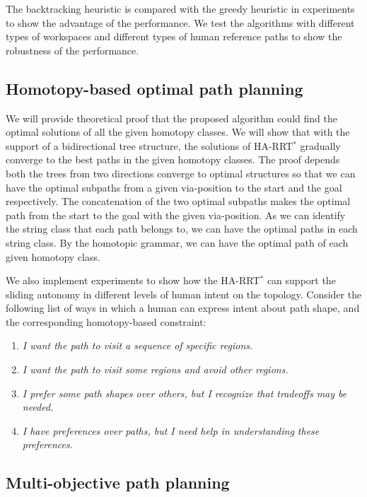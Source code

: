 \documentclass[phd]{byuprop}
\begin{document}
The backtracking heuristic is compared with the greedy heuristic in experiments to show the advantage of the performance.
We test the algorithms with different types of workspaces and different types of human reference paths to show the robustness of the performance.


\subsection{Homotopy-based optimal path planning}

We will provide theoretical proof that the proposed algorithm could find the optimal solutions of all the given homotopy classes.
We will show that with the support of a bidirectional tree structure, the solutions of HA-RRT$^{*}$ gradually converge to the best paths in the given homotopy classes.
The proof depends both the trees from two directions converge to optimal structures so that we can have the optimal subpaths from a given via-position to the start and the goal respectively.
The concatenation of the two optimal subpaths makes the optimal path from the start to the goal with the given via-position.
As we can identify the string class that each path belongs to, we can have the optimal paths in each string class.
By the homotopic grammar, we can have the optimal path of each given homotopy class.

We also implement experiments to show how the HA-RRT$^{*}$ can support the sliding autonomy in different levels of human intent on the topology.
Consider the following list of ways in which a human can express intent about path shape, and the corresponding homotopy-based constraint:
\begin{enumerate}
\item \emph{I want the path to visit a sequence of specific regions.}
\item \emph{I want the path to visit some regions and avoid other regions.}
\item \emph{I prefer some path shapes over others, but I recognize that tradeoffs may be needed.} 
\item \emph{I have preferences over paths, but I need help in understanding these preferences.}
\end{enumerate}

\subsection{Multi-objective path planning}
\end{document}
